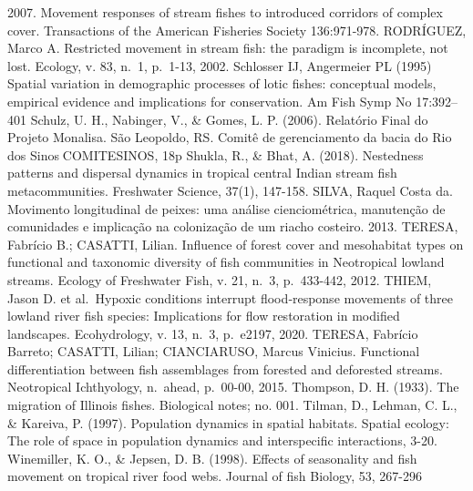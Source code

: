 \documentclass[
]{article}
\begin{document}
2007. Movement responses of stream fishes to introduced corridors of
complex cover. Transactions of the American Fisheries Society
136:971-978. RODRÍGUEZ, Marco A. Restricted movement in stream fish: the
paradigm is incomplete, not lost. Ecology, v. 83, n.~1, p.~1-13, 2002.
Schlosser IJ, Angermeier PL (1995) Spatial variation in demographic
processes of lotic fishes: conceptual models, empirical evidence and
implications for conservation. Am Fish Symp No 17:392--401 Schulz, U.
H., Nabinger, V., \& Gomes, L. P. (2006). Relatório Final do Projeto
Monalisa. São Leopoldo, RS. Comitê de gerenciamento da bacia do Rio dos
SinosCOMITESINOS, 18p Shukla, R., \& Bhat, A. (2018). Nestedness
patterns and dispersal dynamics in tropical central Indian stream fish
metacommunities. Freshwater Science, 37(1), 147-158. SILVA, Raquel Costa
da. Movimento longitudinal de peixes: uma análise cienciométrica,
manutenção de comunidades e implicação na colonização de um riacho
costeiro. 2013. TERESA, Fabrício B.; CASATTI, Lilian. Influence of
forest cover and mesohabitat types on functional and taxonomic diversity
of fish communities in Neotropical lowland streams. Ecology of
Freshwater Fish, v. 21, n.~3, p.~433-442, 2012. THIEM, Jason D. et
al.~Hypoxic conditions interrupt flood‐response movements of three
lowland river fish species: Implications for flow restoration in
modified landscapes. Ecohydrology, v. 13, n.~3, p.~e2197, 2020. TERESA,
Fabrício Barreto; CASATTI, Lilian; CIANCIARUSO, Marcus Vinicius.
Functional differentiation between fish assemblages from forested and
deforested streams. Neotropical Ichthyology, n.~ahead, p.~00-00, 2015.
Thompson, D. H. (1933). The migration of Illinois fishes. Biological
notes; no. 001. Tilman, D., Lehman, C. L., \& Kareiva, P. (1997).
Population dynamics in spatial habitats. Spatial ecology: The role of
space in population dynamics and interspecific interactions, 3-20.
Winemiller, K. O., \& Jepsen, D. B. (1998). Effects of seasonality and
fish movement on tropical river food webs. Journal of fish Biology, 53,
267-296
\end{document}
